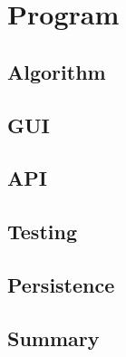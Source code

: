 \chapter{Program}

\section{Algorithm}
\label{AlgorithmProg}

\section{GUI}
\label{GUI}

\section{API}
\label{API}

\section{Testing}
\label{Testing}

\section{Persistence}
\label{Persistence}

\section{Summary}
\label{ProSummary}